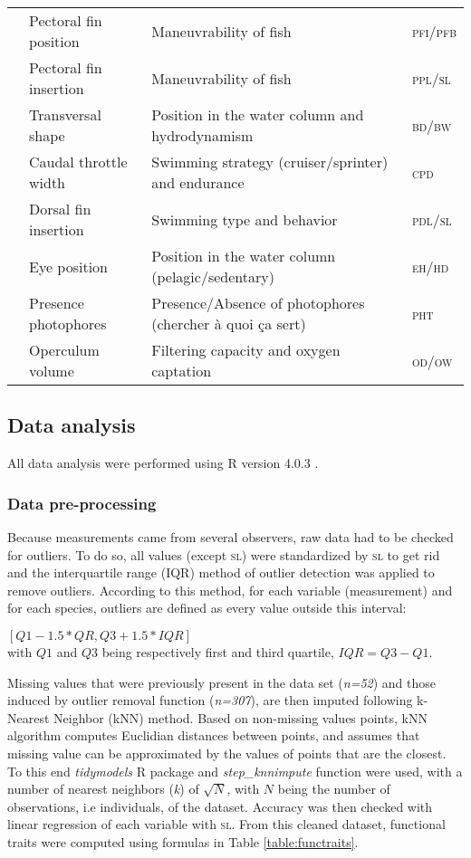 \begin{sidewaystable}
\begin{tabular}{>{\bfseries}lll>{\scshape}l}
  &Pectoral fin position & Maneuvrability of fish & pfi/pfb \\ 
  &Pectoral fin insertion & Maneuvrability of fish & ppl/sl \\ 
  &Transversal shape & Position in the water column and hydrodynamism & bd/bw \\ 
  &Caudal throttle width & Swimming strategy (cruiser/sprinter) and endurance & cpd \\ 
  &Dorsal fin insertion & Swimming type and behavior & pdl/sl \\ 
  \hline
  \multirow{2}{*}{Habitat} &Eye position & Position in the water column (pelagic/sedentary) & eh/hd \\ 
  &Presence photophores & Presence/Absence of photophores (chercher à quoi ça sert) & pht \\ 
  &Operculum volume & Filtering capacity and oxygen captation & od/ow \\ 
   \hline
\end{tabular}
\end{sidewaystable}

\subsection{Data analysis}
All data analysis were performed using \textsf{R} version 4.0.3 \citet{rcoreteam2021}.

\subsubsection{Data pre-processing}
Because measurements came from several observers, raw data had to be checked for outliers. To do so, all values (except \textsc{sl}) were standardized by \textsc{sl} to get rid and the interquartile range (IQR) method of outlier detection was applied to remove outliers. According to this method, for each variable (measurement) and for each species, outliers are defined as every value outside this interval: 
\begin{center}
$ [Q1 - 1.5*QR, Q3 + 1.5*IQR]$ \\
with $Q1$ and $Q3$ being respectively first and third quartile, $IQR = Q3 - Q1$. 
\end{center}{}


Missing values that were previously present in the data set (\textit{n=52}) and those induced by outlier removal function (\textit{n=307}), are then imputed following k-Nearest Neighbor (kNN) method. Based on non-missing values points, kNN algorithm computes Euclidian distances between points, and assumes that missing value can be approximated by the values of points that are the closest. To this end \emph{tidymodels} R package and \emph{step\_knnimpute} function \citep{kuhn2020} were used, with a number of nearest neighbors (\textit{k}) of $\sqrt{N}$, with $N$ being the number of observations, i.e individuals, of the dataset. Accuracy was then checked with linear regression of each variable with \textsc{sl}. From this cleaned dataset, functional traits were computed using formulas in Table \ref{table:functraits}. 

